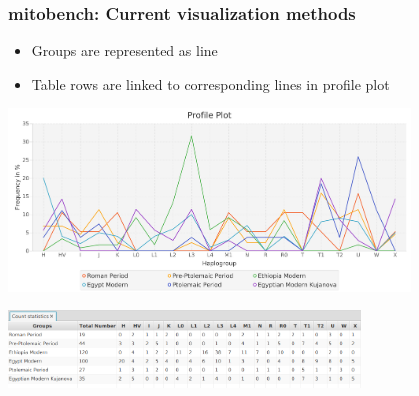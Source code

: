 \documentclass{beamer} %
\begin{document}
\begin{frame}
	\frametitle{mitobench: Current visualization methods}
	\begin{itemize}
		\item Groups are represented as line
		\item Table rows are linked to corresponding lines in profile plot
	\end{itemize}
	
	\begin{center}
		\includegraphics[width=0.8\textwidth]{imagesBench/profile.png}
	\end{center}
	\begin{center}
		\includegraphics[width=0.7\textwidth]{imagesBench/profile_table.png}
	\end{center}
\end{frame}
\end{document}
